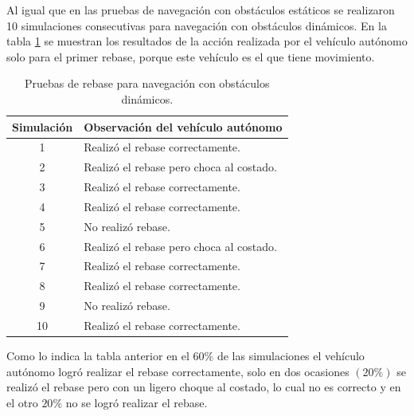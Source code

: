 Al igual que en las pruebas de navegación con obstáculos estáticos se realizaron 10 simulaciones consecutivas para navegación con obstáculos dinámicos. En la tabla \ref{tab:navigation_dynamic_obstacles} se muestran los resultados de la acción realizada por el vehículo autónomo solo para el primer rebase, porque este vehículo es el que tiene movimiento.
\begin{table}[h]
    \begin{center}
        \begin{tabular}{c|l}
        \hline
            Simulación & Observación del vehículo autónomo\\ \hline 
            1 & Realizó el rebase correctamente.\\ 
            2 & Realizó el rebase pero choca al costado.\\ 
            3 & Realizó el rebase correctamente.\\ 
            4 & Realizó el rebase correctamente.\\ 
            5 & No realizó rebase.\\ 
            6 & Realizó el rebase pero choca al costado.\\ 
            7 & Realizó el rebase correctamente.\\ 
            8 & Realizó el rebase correctamente.\\ 
            9 & No realizó rebase.\\ 
            10 & Realizó el rebase correctamente.\\ 
        \end{tabular}
    \end{center}
    \caption{Pruebas de rebase para navegación con obstáculos dinámicos.}
    \label{tab:navigation_dynamic_obstacles}
\end{table}

Como lo indica la tabla anterior en el $60\%$ de las simulaciones el vehículo autónomo logró realizar el rebase correctamente, solo en dos ocasiones $(20\%)$ se realizó el rebase pero con un ligero choque al costado, lo cual no es correcto y en el otro $20\%$ no se logró realizar el rebase.

